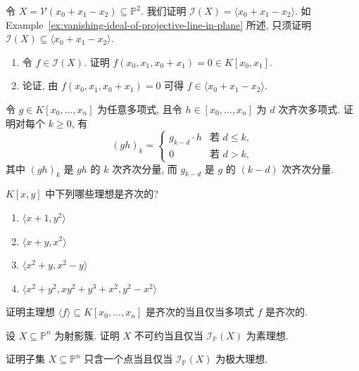 \BookExerciseHeading
\begin{BookExercises}
  \item\label{ex:vanishing-ideal-of-projective-line-by-substitution} 令 $X=\mathcal{V}(x_{0}+x_{1}-x_{2})\subseteq\mathbb{P}^{2}$. 我们证明 $\mathcal{I}(X)=\langle x_{0}+x_{1}-x_{2}\rangle$. 如 Example~\ref{ex:vanishing-ideal-of-projective-line-in-plane} 所述, 只须证明 $\mathcal{I}(X)\subseteq\langle x_{0}+x_{1}-x_{2}\rangle$.
  \begin{enumerate}
    \item 令 $f\in\mathcal{I}(X)$. 证明 $f(x_{0},x_{1},x_{0}+x_{1})=0\in K[x_{0},x_{1}]$.
    \item 论证, 由 $f(x_{0},x_{1},x_{0}+x_{1})=0$ 可得 $f\in\langle x_{0}+x_{1}-x_{2}\rangle$.
  \end{enumerate}
  \item\label{ex:homogeneous-component-of-product-with-homogeneous-factor} 令 $g\in K[x_{0},\ldots,x_{n}]$ 为任意多项式, 且令 $h\in[x_{0},\ldots,x_{n}]$ 为 $d$ 次齐次多项式. 证明对每个 $k\geq0$, 有
  \[
    (gh)_{k}=
    \begin{cases}
      g_{k-d}\cdot h & \text{若 }d\leq k,\\
      0 & \text{若 }d>k,
    \end{cases}
  \]
  其中 $(gh)_{k}$ 是 $gh$ 的 $k$ 次齐次分量, 而 $g_{k-d}$ 是 $g$ 的 $(k-d)$ 次齐次分量.
  \item\label{ex:identify-homogeneous-ideals-in-two-variables} $K[x,y]$ 中下列哪些理想是齐次的?
  \begin{enumerate}
    \item $\langle x+1,y^{2}\rangle$
    \item $\langle x+y,x^{2}\rangle$
    \item $\langle x^{2}+y,x^{2}-y\rangle$
    \item $\langle x^{2}+y^{2},xy^{2}+y^{3}+x^{2},y^{2}-x^{2}\rangle$
  \end{enumerate}
  \item\label{ex:principal-ideal-homogeneous-iff-generator-homogeneous} 证明主理想 $\langle f\rangle\subseteq K[x_{0},\ldots,x_{n}]$ 是齐次的当且仅当多项式 $f$ 是齐次的.
  \item\label{ex:projective-irreducibility-equivalent-to-prime-ideal} 设 $X\subseteq\mathbb{P}^{n}$ 为射影簇. 证明 $X$ 不可约当且仅当 $\mathcal{I}_{\mathbb{P}}(X)$ 为素理想.
  \item\label{ex:projective-single-point-equivalent-to-maximal-ideal} 证明子集 $X\subseteq\mathbb{P}^{n}$ 只含一个点当且仅当 $\mathcal{I}_{\mathbb{P}}(X)$ 为极大理想.

\end{BookExercises}
